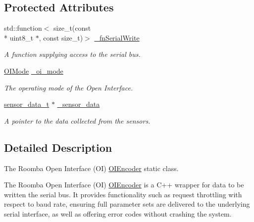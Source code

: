 \subsection*{Protected Attributes}
\begin{DoxyCompactItemize}
\item 
std\+::function$<$ size\+\_\+t(const \\*
uint8\+\_\+t $\ast$, const size\+\_\+t)$>$ \hyperlink{classroomba_1_1series500_1_1oi_1_1_o_i_encoder_adea2ff25939589efd18d0ae64b14049b}{\+\_\+fn\+Serial\+Write}
\begin{DoxyCompactList}\small\item\em A function supplying access to the serial bus. \end{DoxyCompactList}\item 
\hyperlink{namespaceroomba_1_1series500_1_1oi_a8dde6b4ac23e862ae50868c3963d7063}{O\+I\+Mode} \hyperlink{classroomba_1_1series500_1_1oi_1_1_o_i_encoder_a22983349615457194a9714375f391b8b}{\+\_\+oi\+\_\+mode}
\begin{DoxyCompactList}\small\item\em The operating mode of the Open Interface. \end{DoxyCompactList}\item 
\hypertarget{classroomba_1_1series500_1_1oi_1_1_o_i_encoder_aeaf8bdbc3ee35ac20da50619cfaddd86}{\hyperlink{classroomba_1_1series500_1_1oi_1_1_o_i_encoder_a19ddaf411fb6201dde68dd359932992b}{sensor\+\_\+data\+\_\+t} $\ast$ \hyperlink{classroomba_1_1series500_1_1oi_1_1_o_i_encoder_aeaf8bdbc3ee35ac20da50619cfaddd86}{\+\_\+sensor\+\_\+data}}\label{classroomba_1_1series500_1_1oi_1_1_o_i_encoder_aeaf8bdbc3ee35ac20da50619cfaddd86}

\begin{DoxyCompactList}\small\item\em A pointer to the data collected from the sensors. \end{DoxyCompactList}\end{DoxyCompactItemize}


\subsection{Detailed Description}
The Roomba Open Interface (O\+I) \hyperlink{classroomba_1_1series500_1_1oi_1_1_o_i_encoder}{O\+I\+Encoder} static class. 

The Roomba Open Interface (O\+I) \hyperlink{classroomba_1_1series500_1_1oi_1_1_o_i_encoder}{O\+I\+Encoder} is a C++ wrapper for data to be written the serial bus. It provides functionality such as request throttling with respect to baud rate, ensuring full parameter sets are delivered to the underlying serial interface, as well as offering error codes without crashing the system. 

